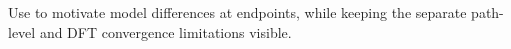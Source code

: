 Use to motivate model differences at endpoints, while keeping the separate path-level and DFT convergence limitations visible.
